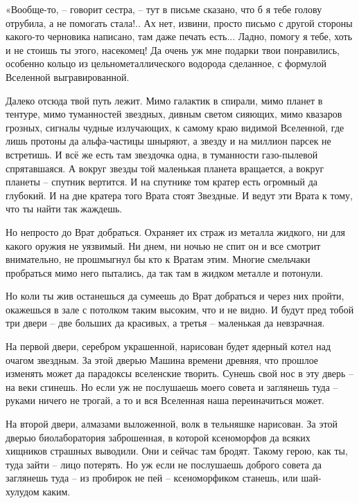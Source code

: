 \documentclass[ebook,oneside,final,openright]{memoir}
\begin{document}
\par
«Вообще-то, – говорит сестра, – тут в письме сказано, что б я тебе голову отрубила, а не помогать стала!.. Ах нет, извини, просто письмо с другой стороны какого-то черновика написано, там даже печать есть... Ладно, помогу я тебе, хоть и не стоишь ты этого, насекомец! Да очень уж мне подарки твои понравились, особенно кольцо из цельнометаллического водорода сделанное, с формулой Вселенной выгравированной.\par
\par
Далеко отсюда твой путь лежит. Мимо галактик в спирали, мимо планет в тентуре, мимо туманностей звездных, дивным светом сияющих, мимо квазаров грозных, сигналы чудные излучающих, к самому краю видимой Вселенной, где лишь протоны да альфа-частицы шныряют, а звезду и на миллион парсек не встретишь. И всё же есть там звездочка одна, в туманности газо-пылевой спрятавшаяся. А вокруг звезды той маленькая планета вращается, а вокруг планеты – спутник вертится. И на спутнике том кратер есть огромный да глубокий. И на дне кратера того Врата стоят Звездные. И ведут эти Врата к тому, что ты найти так жаждешь.\par
\par
Но непросто до Врат добраться. Охраняет их страж из металла жидкого, ни для какого оружия не уязвимый. Ни днем, ни ночью не спит он и все смотрит внимательно, не прошмыгнул бы кто к Вратам этим. Многие смельчаки пробраться мимо него пытались, да так там в жидком металле и потонули.\par
\par
Но коли ты жив останешься да сумеешь до Врат добраться и через них пройти, окажешься в зале с потолком таким высоким, что и не видно. И будут пред тобой три двери – две больших да красивых, а третья – маленькая да невзрачная.\par
\par
На первой двери, серебром украшенной, нарисован будет ядерный котел над очагом звездным. За этой дверью Машина времени древняя, что прошлое изменять может да парадоксы вселенские творить. Сунешь свой нос в эту дверь – на веки сгинешь. Но если уж не послушаешь моего совета и заглянешь туда – руками ничего не трогай, а то и вся Вселенная наша переиначиться может.\par
\par
На второй двери, алмазами выложенной, волк в тельняшке нарисован. За этой дверью биолаборатория заброшенная, в которой ксеноморфов да всяких хищников страшных выводили. Они и сейчас там бродят. Такому герою, как ты, туда зайти – лицо потерять. Но уж если не послушаешь доброго совета да заглянешь туда – из пробирок не пей – ксеноморфиком станешь, или шай-хулудом каким.\par
\end{document}
